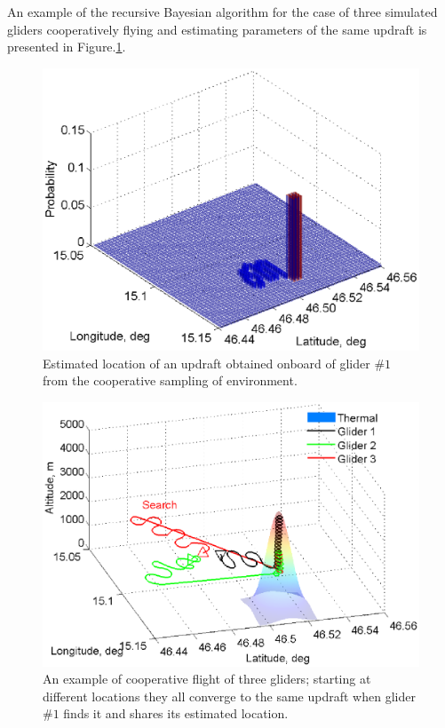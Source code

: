 \documentclass{ifacconf}
\begin{document}
An example of the recursive Bayesian algorithm for the case of three
simulated gliders cooperatively flying and estimating parameters of the same
updraft is presented in Figure.\ref{fig:SimPDF}.
\begin{figure}[thpb]
  \centering
  \includegraphics[scale=0.525]{Figures/Mapping_thermals.eps}
  \caption{Estimated location of an updraft obtained onboard of glider $\#1$ from the cooperative sampling of
  environment.}
  \label{fig:SimPDF}
\end{figure}
\begin{figure}[thpb]
  \centering
  \includegraphics[scale=0.45]{Figures/paths_cooperative_flight.eps}
  \caption{An example of cooperative flight of three gliders; starting at different locations they
  all converge to the same updraft when glider $\#1$ finds it and shares its estimated location.}
  \label{fig:CoopFlightPaths}
\end{figure}
\end{document}
